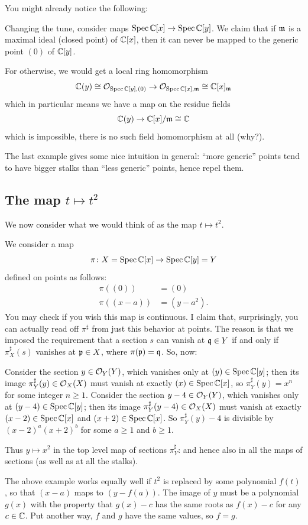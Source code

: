 You might already notice the following:
\begin{example}
	Changing the tune, consider maps $\operatorname{Spec} \mathbb C[x] \to \operatorname{Spec} \mathbb C[y]$.
	We claim that if $\mathfrak m$ is a maximal ideal (closed point)
	of $\mathbb C[x]$, then it can never be mapped to the generic point $(0)$ of $\mathbb C[y]$.

	For otherwise, we would get a local ring homomorphism
	\[ \mathbb C(y) \cong \mathcal O_{\operatorname{Spec} \mathbb C[y], (0)}
		\to \mathcal O_{\operatorname{Spec} \mathbb C[x], \mathfrak m} \cong \mathbb C[x]_\mathfrak m \]
	which in particular means we have a map on the residue fields
	\[ \mathbb C(y) \to \mathbb C[x] / \mathfrak m \cong \mathbb C \]
	which is impossible, there is no such field homomorphism at all (why?).
\end{example}
The last example gives some nice intuition in general:
``more generic'' points tend to have bigger stalks
than ``less generic'' points, hence repel them.

\subsection{The map $t \mapsto t^2$}
We now consider what we would think
of as the map $t \mapsto t^2$.
\begin{example}
	We consider a map
	\[ \pi \colon X = \operatorname{Spec} \mathbb C[x] \to \operatorname{Spec} \mathbb C[y] = Y \]
	defined on points as follows:
	\begin{align*}
		\pi\left( (0) \right) &= (0) \\
		\pi\left( (x-a)  \right) &= (y-a^2).
	\end{align*}
	You may check if you wish this map is continuous.
	I claim that, surprisingly,
	you can actually read off $\pi^\sharp$ from just this
	behavior at points.
	The reason is that we imposed the requirement
	that a section $s$ can vanish at $\mathfrak q \in Y$
	if and only if $\pi^\sharp_X(s)$ vanishes at $\mathfrak p \in X$,
	where $\pi(\mathfrak p) = \mathfrak q$.
	So, now:
	\begin{itemize}
		\ii Consider the section $y \in \mathcal O_Y(Y)$,
		which vanishes only at $(y) \in \operatorname{Spec} \mathbb C[y]$;
		then its image $\pi^\sharp_Y(y) \in \mathcal O_X(X)$
		must vanish at exactly $(x) \in \operatorname{Spec} \mathbb C[x]$,
		so $\pi^\sharp_Y(y) = x^n$ for some integer $n \ge 1$.
		\ii Consider the section $y-4 \in \mathcal O_Y(Y)$,
		which vanishes only at $(y-4) \in \operatorname{Spec} \mathbb C[y]$;
		then its image $\pi^\sharp_Y(y-4) \in \mathcal O_X(X)$
		must vanish at exactly $(x-2) \in \operatorname{Spec} \mathbb C[x]$
		and $(x+2) \in \operatorname{Spec} \mathbb C[x]$.
		So $\pi^\sharp_Y(y)-4$ is divisible by $(x-2)^a(x+2)^b$
		for some $a \ge 1$ and $b \ge 1$.
	\end{itemize}
	Thus $y \mapsto x^2$ in the top level map of sections $\pi^\sharp_Y$:
	and hence also in all the maps of sections
	(as well as at all the stalks).
\end{example}
The above example works equally well if $t^2$ is replaced
by some polynomial $f(t)$,
so that $(x-a)$ maps to $(y-f(a))$.
The image of $y$ must be a polynomial $g(x)$
with the property that $g(x)-c$ has the same roots as $f(x)-c$
for any $c \in \mathbb C$.
Put another way, $f$ and $g$ have the same values, so $f = g$.

